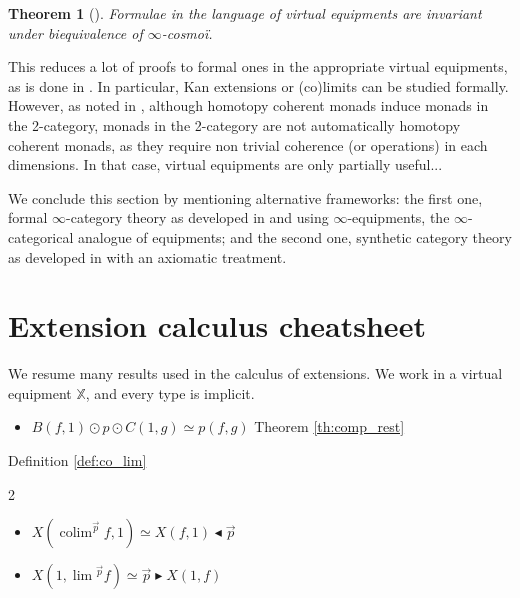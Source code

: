 \documentclass[10pt,a4paper]{article}
\newcommand{\bb}[1]{\mathbb{#1}}
\newcommand{\rext}{\mathbin{\blacktriangleright}}
\newcommand{\rift}{\mathbin{\blacktriangleleft}}
\DeclareMathOperator{\colim}{colim}
\theoremstyle{plain}
\newtheorem{theorem}{Theorem}[subsection]
\theoremstyle{definition}
\theoremstyle{remark}
\begin{document}
\begin{theorem}[{\cite[Corollary 11.3.10]{riehl_verity}}]
    Formulae in the language of virtual equipments are invariant under biequivalence of $\infty$-cosmoï.
\end{theorem}

This reduces a lot of proofs to formal ones in the appropriate virtual equipments, as is done in \cite[Section 9]{riehl_verity}. In particular, Kan extensions or (co)limits can be studied formally. However, as noted in \cite[Subsection 1.3]{riehl2015homotopycoherentadjunctionsformal}, although homotopy coherent monads induce monads in the 2-category, monads in the 2-category are not automatically homotopy coherent monads, as they require non trivial coherence (or operations) in each dimensions. In that case, virtual equipments are only partially useful...

We conclude this section by mentioning alternative frameworks: the first one, formal $\infty$-category theory as developed in \cite{ruit2025formalcategorytheoryinftyequipments} and using $\infty$-equipments, the $\infty$-categorical analogue of equipments; and the second one, synthetic category theory as developed in \cite{cisinski_synthetic} with an axiomatic treatment.



\clearpage
\appendix

\section{Extension calculus cheatsheet}

We resume many results used in the calculus of extensions. We work in a virtual equipment $\bb{X}$, and every type is implicit.

\begin{itemize}
    \item $B(f, 1) \odot p \odot C(1, g) \simeq p(f, g)$
        \hfill Theorem \ref{th:comp_rest}
\end{itemize}

\begin{center}
    Definition \ref{def:co_lim}
\end{center}
\begin{multicols}{2}
    \begin{itemize}
        \item $X(\colim^{\vec{p}}f, 1) \simeq X(f, 1) \rift \vec{p}$
        \item $X(1, \lim{}^{\vec{p}}f) \simeq \vec{p} \rext X(1, f)$
    \end{itemize}
\end{multicols}
\end{document}

